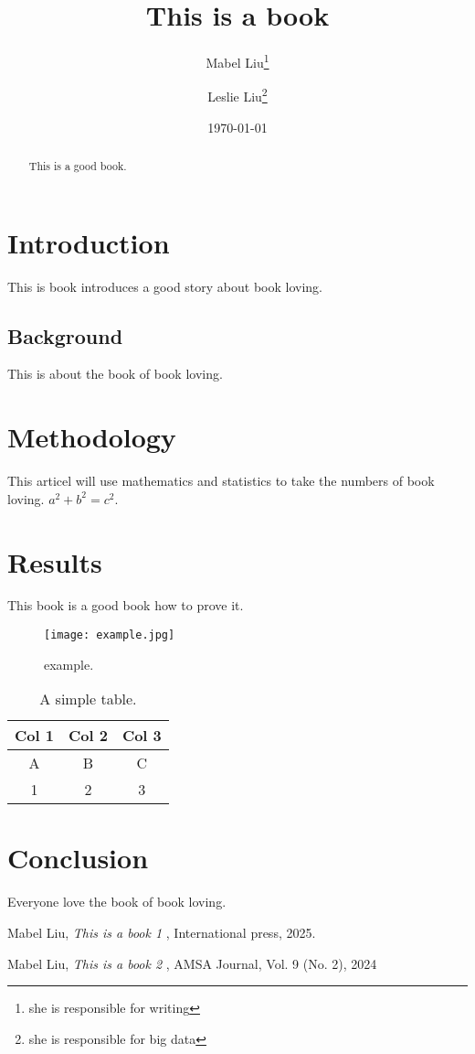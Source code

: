 \documentclass[a4paper,12pt]{article} %
\title{This is a book}
\author{
  Mabel Liu\thanks{she is responsible for writing} \and
  Leslie Liu\thanks{she is responsible for big data}
}
\date{\today}
\begin{document}
\maketitle

\begin{abstract}
This is a good book.
\end{abstract}

\section{Introduction}
This is book introduces a good story about book loving.
\subsection{Background}
This is about the book of book loving.
\section{Methodology}
This articel will use mathematics and statistics to take the numbers of book loving.
\( a^2 + b^2 = c^2 \).
\section{Results}
This book is a good book how to prove it.

\begin{figure}[h]
  \centering
  \texttt{[image: example.jpg]}
  \caption{example.}
  \label{fig:sample}
\end{figure}

\begin{table}[h]
\centering
\begin{tabular}{|c|c|c|}
\hline
Col 1 & Col 2 & Col 3 \\
\hline
A & B & C \\
\hline
1&2&3\\
\hline
\end{tabular}
\caption{A simple table.}
\end{table}
\section{Conclusion}
Everyone love the book of book loving.

\begin{thebibliography}{9}
 Mabel Liu, \textit{This is a book 1 }, International press, 2025.

 Mabel Liu, \textit{This is a book 2 }, AMSA Journal, Vol. 9 (No. 2), 2024

\end{thebibliography}
\end{document}
